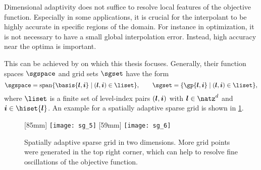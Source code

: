 Dimensional adaptivity does not suffice to resolve local features of the
objective function.
Especially in some applications, it is crucial for the
interpolant to be highly accurate in specific regions of the domain.
For instance in optimization, it is not necessary to have a small global
interpolation error.
Instead, high accuracy near the optima is important.

This can be achieved by 
on which this thesis focuses.
Generally, their function spaces $\sgspace$
and grid sets $\sgset$ have the form
\begin{equation}
  \label{eq:spatiallyAdaptiveSG}
  \sgspace
  = \spn\{\basis{\*l,\*i} \mid (\*l,\*i) \in \liset\},\qquad
  \sgset
  = \{\gp{\*l,\*i} \mid (\*l,\*i) \in \liset\},
\end{equation}
where $\liset$ is a finite set of level-index pairs $({\boldsymbol{l}},{\boldsymbol{i}})$
with $\*l \in \natz^d$ and $\*i \in \hiset{\*l}$.
An example for a spatially adaptive sparse grid is shown in
\cref{fig:spatiallyAdaptiveSG}.

\begin{figure}
  [85mm]{%
    \texttt{[image: sg\_5]}%
    \hspace*{1.411224mm}%
  }%
  \hfill%
  [59mm]{%
    \texttt{[image: sg\_6]}%
  }%
  \caption[%
    Construction of spatially adaptive sparse grids%
  ]{%
    Spatially adaptive sparse grid in two dimensions.
    More grid points were generated in the top right corner,
    which can help to resolve fine oscillations of the objective function.%
  }%
  \label{fig:spatiallyAdaptiveSG}%
\end{figure}

